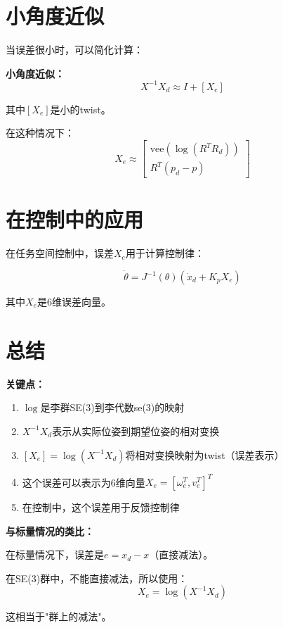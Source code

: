 \documentclass[12pt,a4paper]{article}
\begin{document}
\section{小角度近似}

当误差很小时，可以简化计算：

\textbf{小角度近似：}
\begin{equation}
X^{-1} X_d \approx I + [X_e]
\end{equation}

其中$[X_e]$是小的twist。

在这种情况下：
\begin{equation}
X_e \approx \begin{bmatrix}
\text{vee}(\log(R^T R_d)) \\
R^T(p_d - p)
\end{bmatrix}
\end{equation}

\section{在控制中的应用}

在任务空间控制中，误差$X_e$用于计算控制律：

\begin{equation}
\dot{\theta} = J^{-1}(\theta)\left(\dot{x}_d + K_p X_e\right)
\end{equation}

其中$X_e$是6维误差向量。

\section{总结}

\textbf{关键点：}

\begin{enumerate}
\item $\log$是李群SE(3)到李代数se(3)的映射
\item $X^{-1} X_d$表示从实际位姿到期望位姿的相对变换
\item $[X_e] = \log(X^{-1} X_d)$将相对变换映射为twist（误差表示）
\item 这个误差可以表示为6维向量$X_e = [\omega_e^T, v_e^T]^T$
\item 在控制中，这个误差用于反馈控制律
\end{enumerate}

\textbf{与标量情况的类比：}

在标量情况下，误差是$e = x_d - x$（直接减法）。

在SE(3)群中，不能直接减法，所以使用：
\begin{equation}
X_e = \log(X^{-1} X_d)
\end{equation}

这相当于"群上的减法"。
\end{document}
